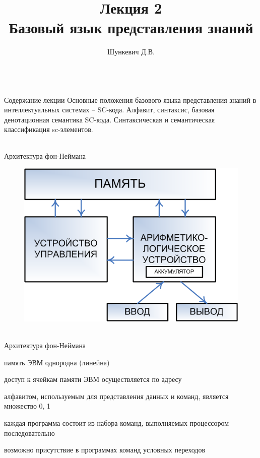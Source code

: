 \title{Лекция 2\\Базовый язык представления знаний}   
\author[]{Шункевич Д.В.}

\begin{frame}
	\titlepage
\end{frame}

\begin{frame}{\\Содержание лекции}
	\topline
	\justifying
	Основные положения базового языка представления знаний в интеллектуальных системах – SC-кода.
	Алфавит, синтаксис, базовая денотационная семантика SC-кода.
	Синтаксическая и семантическая классификация sc-элементов.
\end{frame}

\begin{frame}{\\Архитектура фон-Неймана}
	\topline
	\justifying
	\vspace{10mm}
	\begin{figure}[H]
		\includegraphics[scale=0.6]{./figures/sd_sc_code/neuman.png}
	\end{figure}
\end{frame}

\begin{frame}{\\Архитектура фон-Неймана}
	\topline
	\justifying
	\large
	\begin{textitemize}
		\item память ЭВМ однородна (линейна)
		\item доступ к ячейкам памяти ЭВМ осуществляется по адресу
		\item алфавитом, используемым для представления данных и команд, является множество {0, 1}
		\item каждая программа состоит из набора команд, выполняемых процессором последовательно
		\item возможно присутствие в программах команд условных переходов
	\end{textitemize}
\end{frame}

